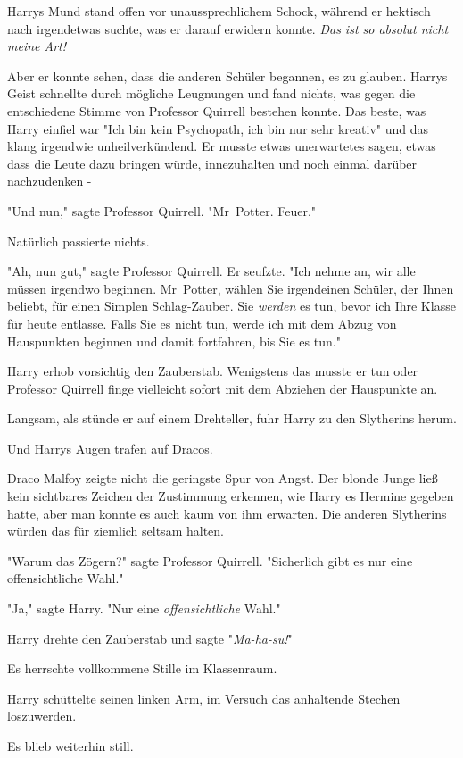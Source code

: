 {Harrys Mund stand offen vor unaussprechlichem Schock, während er hektisch nach irgendetwas suchte, was er darauf erwidern konnte. \emph{Das ist so absolut nicht meine Art!}

Aber er konnte sehen, dass die anderen Schüler begannen, es zu glauben. Harrys Geist schnellte durch mögliche Leugnungen und fand nichts, was gegen die entschiedene Stimme von Professor Quirrell bestehen konnte. Das beste, was Harry einfiel war "Ich bin kein Psychopath, ich bin nur sehr kreativ" und das klang irgendwie unheilverkündend. Er musste etwas unerwartetes sagen, etwas dass die Leute dazu bringen würde, innezuhalten und noch einmal darüber nachzudenken -

"Und nun," sagte Professor Quirrell. "Mr~Potter. Feuer."

Natürlich passierte nichts.

"Ah, nun gut," sagte Professor Quirrell. Er seufzte. "Ich nehme an, wir alle müssen irgendwo beginnen. Mr~Potter, wählen Sie irgendeinen Schüler, der Ihnen beliebt, für einen Simplen Schlag-Zauber. Sie \emph{werden} es tun, bevor ich Ihre Klasse für heute entlasse. Falls Sie es nicht tun, werde ich mit dem Abzug von Hauspunkten beginnen und damit fortfahren, bis Sie es tun."

Harry erhob vorsichtig den Zauberstab. Wenigstens das musste er tun oder Professor Quirrell finge vielleicht sofort mit dem Abziehen der Hauspunkte an.

Langsam, als stünde er auf einem Drehteller, fuhr Harry zu den Slytherins herum.

Und Harrys Augen trafen auf Dracos.

Draco Malfoy zeigte nicht die geringste Spur von Angst. Der blonde Junge ließ kein sichtbares Zeichen der Zustimmung erkennen, wie Harry es Hermine gegeben hatte, aber man konnte es auch kaum von ihm erwarten. Die anderen Slytherins würden das für ziemlich seltsam halten.

"Warum das Zögern?" sagte Professor Quirrell. "Sicherlich gibt es nur eine offensichtliche Wahl."

"Ja," sagte Harry. "Nur eine \emph{offensichtliche} Wahl."

Harry drehte den Zauberstab und sagte "\emph{Ma-ha-su!}"

Es herrschte vollkommene Stille im Klassenraum.

Harry schüttelte seinen linken Arm, im Versuch das anhaltende Stechen loszuwerden.

Es blieb weiterhin still.

}
